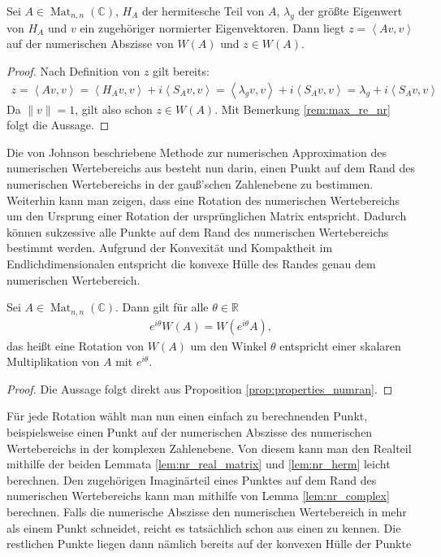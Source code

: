 \begin{lem} \label{lem:nr_complex}
	Sei $A \in \operatorname{Mat}_{n,n}(\mathbb{C})$, $H_A$ der hermitesche Teil von $A$, $\lambda_g$ der größte Eigenwert von $H_A$ und $v$ ein zugehöriger normierter Eigenvektoren.  Dann \phantom{..} liegt $z=\left< Av,v \right>$ auf der numerischen Abszisse von $W(A)$ und $z \in W(A)$.
\end{lem}
\begin{proof}
	Nach Definition von $z$ gilt bereits: \begin{align}
		z=\left< Av,v \right> = \left< H_A v,v \right> + i \left< S_Av,v \right> = \left< \lambda_g v,v \right> + i \left< S_Av,v \right> = \lambda_g + i \left< S_Av,v \right>
	\end{align}
	Da $\|v\|=1$, gilt also schon $z \in W(A)$. Mit Bemerkung \ref{rem:max_re_nr} folgt die Aussage.
\end{proof}

Die von Johnson beschriebene Methode zur numerischen Approximation des numerischen Wertebereichs aus \parencite{johnson1978numerical} besteht nun darin, einen Punkt auf dem Rand des numerischen Wertebereichs in der gauß'schen Zahlenebene zu bestimmen. Weiterhin kann man zeigen, dass eine Rotation des numerischen Wertebereichs um den Ursprung einer Rotation der ursprünglichen Matrix entspricht. Dadurch können sukzessive alle Punkte auf dem Rand des numerischen Wertebereichs bestimmt werden. Aufgrund der Konvexität und Kompaktheit im Endlichdimensionalen entspricht die konvexe Hülle des Randes genau dem numerischen Wertebereich.

\begin{cor}
	Sei $A \in \operatorname{Mat}_{n,n}(\mathbb{C})$. Dann gilt für alle $\theta \in \mathbb{R}$ \begin{align*}
		e^{i\theta} W(A)=W(e^{i\theta}A),
	\end{align*}das heißt eine Rotation von $W(A)$ um den Winkel $\theta$ entspricht einer skalaren Multiplikation von $A$ mit $e^{i\theta}$. 
\end{cor}
\begin{proof}
	Die Aussage folgt direkt aus Proposition \ref{prop:properties_numran}.
\end{proof}

Für jede Rotation wählt man nun einen einfach zu berechnenden Punkt, beispielsweise einen Punkt auf der numerischen Abszisse des numerischen Wertebereichs in der komplexen Zahlenebene. Von diesem kann man den Realteil mithilfe der beiden Lemmata \ref{lem:nr_real_matrix} und \ref{lem:nr_herm} leicht berechnen. Den zugehörigen Imaginärteil eines Punktes auf dem Rand des numerischen Wertebereichs kann man mithilfe von Lemma \ref{lem:nr_complex} berechnen. Falls die numerische Abszisse den numerischen Wertebereich in mehr als einem Punkt schneidet, reicht es tatsächlich schon aus einen zu kennen. Die restlichen Punkte liegen dann nämlich bereits auf der konvexen Hülle der Punkte \parencite[vgl. ][Theorem 3]{johnson1978numerical}

